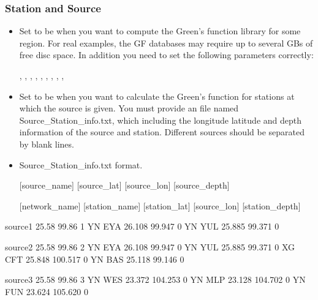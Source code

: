 \documentclass[a4paper,10pt,english,openany]{sphinxmanual}
\begin{document}
\subsubsection{Station and Source}
\label{\detokenize{tutorials/S1_Build_GFs:station-and-source}}
\begin{itemize}
\item {} 
Set to be  when you want to compute the Green’s function library for some region. For real
examples, the GF databases may require up to several GBs of free disc space.
In addition you need to set the following parameters correctly:

,
,
,
,
,
,
,
,
,

\item {} 
Set to be  when you want to calculate the Green’s function for stations at which the source is given.
You must provide an  file named Source\_Station\_info.txt, which including the longitude latitude and depth
information of the source and station. Different sources should be separated by blank lines.

\item {} 
Source\_Station\_info.txt format.

{[}source\_name{]} {[}source\_lat{]}    {[}source\_lon{]}    {[}source\_depth{]}

{[}network\_name{]}        {[}station\_name{]}  {[}station\_lat{]}   {[}source\_lon{]}    {[}station\_depth{]}

\end{itemize}

\begin{sphinxVerbatim}[commandchars=\\\{\},numbers=left,firstnumber=1,stepnumber=1]
source\PYGZus{}1  25.58 99.86  1
YN EYA 26.108 99.947 0
YN YUL 25.885 99.371 0

source\PYGZus{}2  25.58 99.86  2
YN EYA 26.108 99.947 0
YN YUL 25.885 99.371 0
XG CFT 25.848 100.517 0
YN BAS 25.118 99.146 0

source\PYGZus{}3  25.58 99.86  3
YN WES 23.372 104.253 0
YN MLP 23.128 104.702 0
YN FUN 23.624 105.620 0
\end{sphinxVerbatim}
\end{document}
